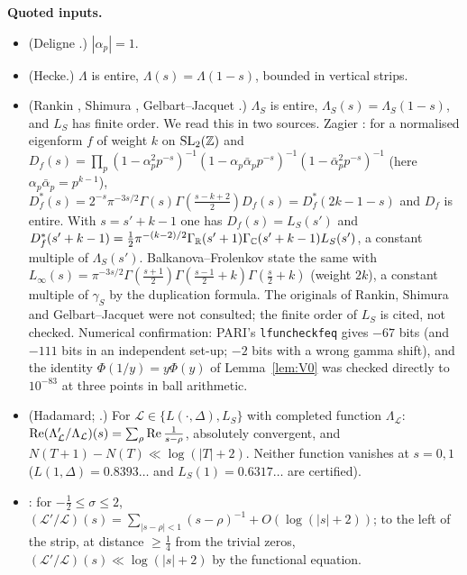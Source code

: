 \medskip\noindent\textbf{Quoted inputs.}
\begin{itemize}
\item[(F1)] (Deligne \cite{Deligne}.) $|\alpha_p|=1$.
\item[(F2)] (Hecke.) $\Lambda$ is entire, $\Lambda(s)=\Lambda(1-s)$, bounded in vertical strips.
\item[(F3)] (Rankin \cite{Rankin}, Shimura \cite{Shimura}, Gelbart--Jacquet \cite{GJ}.) $\Lambda_S$ is entire, $\Lambda_S(s)=\Lambda_S(1-s)$, and $L_S$ has finite order. We read this in two sources. Zagier \cite[eq.~(4), p.~109 and Corollary~1, p.~111]{Zagier}: for a normalised eigenform $f$ of weight $k$ on $\mathrm{SL}_2(\mathbb Z)$ and $D_f(s)=\prod_p(1-\alpha_p^2p^{-s})^{-1}(1-\alpha_p\bar\alpha_pp^{-s})^{-1}(1-\bar\alpha_p^2p^{-s})^{-1}$ (here $\alpha_p\bar\alpha_p=p^{k-1}$), $D_f^*(s)=2^{-s}\pi^{-3s/2}\Gamma(s)\Gamma(\frac{s-k+2}2)D_f(s)=D_f^*(2k-1-s)$ and $D_f$ is entire. With $s=s'+k-1$ one has $D_f(s)=L_S(s')$ and $D_f^*(s'+k-1)=\frac12\pi^{-(k-2)/2}\Gamma_{\mathbb R}(s'+1)\Gamma_{\mathbb C}(s'+k-1)L_S(s')$, a constant multiple of $\Lambda_S(s')$. Balkanova--Frolenkov \cite[(2-4)--(2-5)]{BF} state the same with $L_\infty(s)=\pi^{-3s/2}\Gamma(\frac{s+1}2)\Gamma(\frac{s-1}2+k)\Gamma(\frac s2+k)$ (weight $2k$), a constant multiple of $\gamma_S$ by the duplication formula. The originals of Rankin, Shimura and Gelbart--Jacquet were not consulted; the finite order of $L_S$ is cited, not checked. Numerical confirmation: PARI's \texttt{lfuncheckfeq} gives $-67$ bits (and $-111$ bits in an independent set-up; $-2$ bits with a wrong gamma shift), and the identity $\Phi(1/y)=y\Phi(y)$ of Lemma~\ref{lem:V0} was checked directly to $10^{-83}$ at three points in ball arithmetic.
\item[(F4)] (Hadamard; \cite[Theorem~5.6, Proposition~5.7]{IK}.) For $\mathcal L\in\{L(\cdot,\Delta),L_S\}$ with completed function $\Lambda_{\mathcal L}$: $\operatorname{Re}(\Lambda_{\mathcal L}'/\Lambda_{\mathcal L})(s)=\sum_\rho\operatorname{Re}\frac1{s-\rho}$, absolutely convergent, and $N(T+1)-N(T)\ll\log(|T|+2)$. Neither function vanishes at $s=0,1$ ($L(1,\Delta)=0.8393\ldots$ and $L_S(1)=0.6317\ldots$ are certified).
\item[(F5)] \cite[Proposition~5.7(2)]{IK}: for $-\frac12\le\sigma\le2$, $(\mathcal L'/\mathcal L)(s)=\sum_{|s-\rho|<1}(s-\rho)^{-1}+O(\log(|s|+2))$; to the left of the strip, at distance $\ge\frac14$ from the trivial zeros, $(\mathcal L'/\mathcal L)(s)\ll\log(|s|+2)$ by the functional equation.

\end{itemize}
